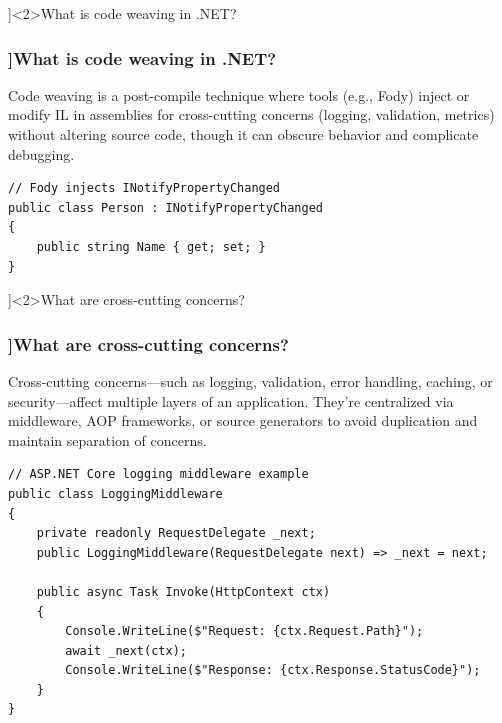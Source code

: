 \QuestionSlide[\CategoryBadge[MetaColor!20]{Metaprogramming}]<2>{What is code weaving in .NET?}
\begin{frame}[fragile]
  \frametitle{\AnswerTitle[\CategoryBadge[MetaColor!20]{Metaprogramming}]{What is code weaving in .NET?}}

  {\footnotesize
    Code weaving is a post-compile technique where tools (e.g., Fody) inject or modify IL in assemblies for cross-cutting concerns (logging, validation, metrics) without altering source code, though it can obscure behavior and complicate debugging.
  }

  \begin{verbatim}
// Fody injects INotifyPropertyChanged
public class Person : INotifyPropertyChanged
{
    public string Name { get; set; }
}
  \end{verbatim}
\end{frame}

\QuestionSlide[\CategoryBadge[ArchColor!20]{Architecture}]<2>{What are cross-cutting concerns?}
\begin{frame}[fragile]
  \frametitle{\AnswerTitle[\CategoryBadge[ArchColor!20]{Architecture}]{What are cross-cutting concerns?}}

  {\footnotesize
    Cross-cutting concerns—such as logging, validation, error handling, caching, or security—affect multiple layers of an application. They're centralized via middleware, AOP frameworks, or source generators to avoid duplication and maintain separation of concerns.
  }

  \begin{verbatim}
// ASP.NET Core logging middleware example
public class LoggingMiddleware
{
    private readonly RequestDelegate _next;
    public LoggingMiddleware(RequestDelegate next) => _next = next;

    public async Task Invoke(HttpContext ctx)
    {
        Console.WriteLine($"Request: {ctx.Request.Path}");
        await _next(ctx);
        Console.WriteLine($"Response: {ctx.Response.StatusCode}");
    }
}
  \end{verbatim}
\end{frame}

